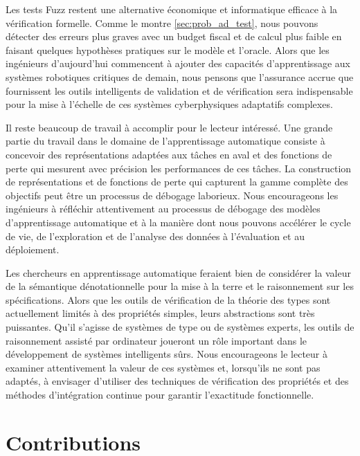 Les tests Fuzz restent une alternative économique et informatique efficace à la vérification formelle. Comme le montre \autoref{sec:prob_ad_test}, nous pouvons détecter des erreurs plus graves avec un budget fiscal et de calcul plus faible en faisant quelques hypothèses pratiques sur le modèle et l'oracle. Alors que les ingénieurs d'aujourd'hui commencent à ajouter des capacités d'apprentissage aux systèmes robotiques critiques de demain, nous pensons que l'assurance accrue que fournissent les outils intelligents de validation et de vérification sera indispensable pour la mise à l'échelle de ces systèmes cyberphysiques adaptatifs complexes.

Il reste beaucoup de travail à accomplir pour le lecteur intéressé. Une grande partie du travail dans le domaine de l'apprentissage automatique consiste à concevoir des représentations adaptées aux tâches en aval et des fonctions de perte qui mesurent avec précision les performances de ces tâches. La construction de représentations et de fonctions de perte qui capturent la gamme complète des objectifs peut être un processus de débogage laborieux. Nous encourageons les ingénieurs à réfléchir attentivement au processus de débogage des modèles d'apprentissage automatique et à la manière dont nous pouvons accélérer le cycle de vie, de l'exploration et de l'analyse des données à l'évaluation et au déploiement.

Les chercheurs en apprentissage automatique feraient bien de considérer la valeur de la sémantique dénotationnelle pour la mise à la terre et le raisonnement sur les spécifications. Alors que les outils de vérification de la théorie des types sont actuellement limités à des propriétés simples, leurs abstractions sont très puissantes. Qu'il s'agisse de systèmes de type ou de systèmes experts, les outils de raisonnement assisté par ordinateur joueront un rôle important dans le développement de systèmes intelligents sûrs. Nous encourageons le lecteur à examiner attentivement la valeur de ces systèmes et, lorsqu'ils ne sont pas adaptés, à envisager d'utiliser des techniques de vérification des propriétés et des méthodes d'intégration continue pour garantir l'exactitude fonctionnelle.

\section{Contributions}


